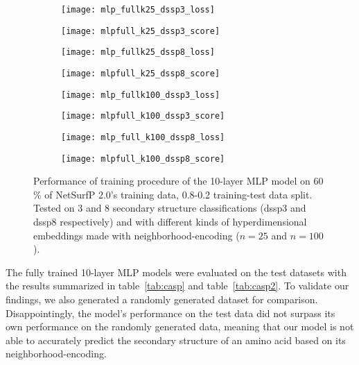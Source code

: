 \begin{figure}[htbp]
    \centering
    \begin{subfigure}{0.48\textwidth}
        \texttt{[image: mlp\_fullk25\_dssp3\_loss]}
        \label{fig:subefig}
    \end{subfigure}
    \hfill
    \begin{subfigure}{0.48\textwidth}
        \texttt{[image: mlpfull\_k25\_dssp3\_score]}
        \label{fig:subefi}
    \end{subfigure}
    
    \begin{subfigure}{0.48\textwidth}
        \texttt{[image: mlp\_fullk25\_dssp8\_loss]}
        \label{fig:subef}
    \end{subfigure}
    \hfill
    \begin{subfigure}{0.48\textwidth}
        \texttt{[image: mlpfull\_k25\_dssp8\_score]}
        \label{fig:sube}
    \end{subfigure}
    
    \begin{subfigure}{0.48\textwidth}
        \texttt{[image: mlp\_fullk100\_dssp3\_loss]}
        \label{fig:sue}
    \end{subfigure}
    \hfill
    \begin{subfigure}{0.48\textwidth}
        \texttt{[image: mlpfull\_k100\_dssp3\_score]}
        \label{fig:se}
    \end{subfigure}
    
    \begin{subfigure}{0.48\textwidth}
        \texttt{[image: mlp\_full\_k100\_dssp8\_loss]}
        \label{fig:sge}
    \end{subfigure}
    \hfill
    \begin{subfigure}{0.48\textwidth}
        \texttt{[image: mlpfull\_k100\_dssp8\_score]}
        \label{fig:she}
    \end{subfigure}
    \caption{Performance of training procedure of the 10-layer MLP model on 60 \% of NetSurfP 2.0's training data, 0.8-0.2 training-test data split. Tested on 3 and 8 secondary structure classifications (dssp3 and dssp8 respectively) and with different kinds of hyperdimensional embeddings made with neighborhood-encoding ($n = 25$ and $n=100$).}
    \label{fig:main8e}
  \end{figure}

The fully trained 10-layer MLP models were evaluated on the test datasets with the results summarized in table~\ref{tab:casp} and table~\ref{tab:casp2}. To validate our findings, we also generated a randomly generated dataset for comparison. Disappointingly, the model's performance on the test data did not surpass its own performance on the randomly generated data, meaning that our model is not able to accurately predict the secondary structure of an amino acid based on its neighborhood-encoding.

